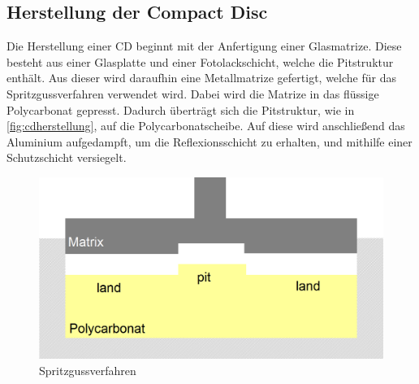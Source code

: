\subsection{Herstellung der Compact Disc}
\label{subsec:cdherstellung}

Die Herstellung einer CD beginnt mit der Anfertigung einer Glasmatrize. Diese
besteht aus einer Glasplatte und einer Fotolackschicht, welche die Pitstruktur
enthält. Aus dieser wird daraufhin eine Metallmatrize gefertigt, welche für das
Spritzgussverfahren verwendet wird. Dabei wird die Matrize in das flüssige
Polycarbonat gepresst. Dadurch überträgt sich die Pitstruktur, wie in
\autoref{fig:cdherstellung}, auf die Polycarbonatscheibe. Auf diese wird
anschließend das Aluminium aufgedampft, um die Reflexionsschicht zu erhalten,
und mithilfe einer Schutzschicht versiegelt. \cite{cdp}

\begin{figure}[h]
  \begin{center}
      \begin{minipage}[t]{\textwidth}
        \begin{center}
            \includegraphics[height=0.1\textheight]{Bilder/Optische_Datentraeger_Die_Compact_Disc/Herstellung/cdherstellung.png}
            \caption[Spritzgussverfahren \newline \url{http://daten.didaktikchemie.uni-bayreuth.de/umat/cd_dvd/spritzguss.gif} (zuletzt aufgerufen am 07.08.2015)]{Spritzgussverfahren}
            \label{fig:cdherstellung}
        \end{center}
      \end{minipage}
  \end{center}
\end{figure}
